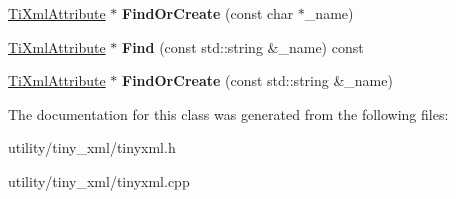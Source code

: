 \begin{DoxyCompactItemize}
\item 
\hypertarget{class_ti_xml_attribute_set_a5e28f5d32f048fba85d04dc317495bdc}{}\label{class_ti_xml_attribute_set_a5e28f5d32f048fba85d04dc317495bdc} 
\hyperlink{class_ti_xml_attribute}{Ti\+Xml\+Attribute} $\ast$ {\bfseries Find\+Or\+Create} (const char $\ast$\+\_\+name)
\item 
\hypertarget{class_ti_xml_attribute_set_a828d42fe3db4ed78bba9ab270190c670}{}\label{class_ti_xml_attribute_set_a828d42fe3db4ed78bba9ab270190c670} 
\hyperlink{class_ti_xml_attribute}{Ti\+Xml\+Attribute} $\ast$ {\bfseries Find} (const std\+::string \&\+\_\+name) const
\item 
\hypertarget{class_ti_xml_attribute_set_acccd76e3d87a92caed2795266c6e540e}{}\label{class_ti_xml_attribute_set_acccd76e3d87a92caed2795266c6e540e} 
\hyperlink{class_ti_xml_attribute}{Ti\+Xml\+Attribute} $\ast$ {\bfseries Find\+Or\+Create} (const std\+::string \&\+\_\+name)
\end{DoxyCompactItemize}


The documentation for this class was generated from the following files\+:\begin{DoxyCompactItemize}
\item 
utility/tiny\+\_\+xml/tinyxml.\+h\item 
utility/tiny\+\_\+xml/tinyxml.\+cpp\end{DoxyCompactItemize}
